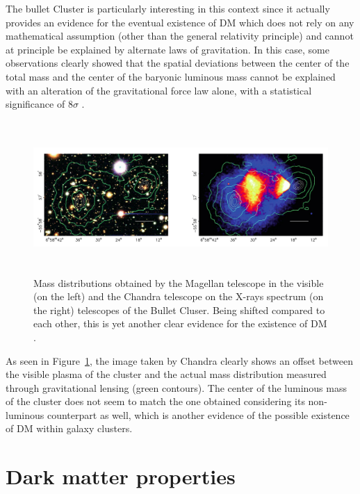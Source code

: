 \documentclass[a4paper, 10pt, openright]{report}
\begin{document}
The bullet Cluster is particularly interesting in this context since it actually provides an evidence for the eventual existence of \ac{DM} which does not rely on any mathematical assumption (other than the general relativity principle) and cannot at principle be explained by alternate laws of gravitation. In this case, some observations clearly showed that the spatial deviations between the center of the total mass and the center of the baryonic luminous mass cannot be explained with an alteration of the gravitational force law alone, with a statistical significance of $8 \sigma$ \cite{BulletClusterSigma}.

\begin{figure}[htbp]
\begin{center}
\includegraphics[width=14.2cm, height=5.8cm]{figs/BulletCluster.png}
\caption{Mass distributions obtained by the Magellan telescope in the visible (on the left) and the Chandra telescope on the X-rays spectrum (on the right) telescopes of the Bullet Cluser. Being shifted compared to each other, this is yet another clear evidence for the existence of \ac{DM} \cite{BulletClusterSigma}.}
\label{figure:BulletCluster}
\end{center}
\end{figure}

As seen in Figure~\ref{figure:BulletCluster}, the image taken by Chandra clearly shows an offset between the visible plasma of the cluster and the actual mass distribution measured through gravitational lensing (green contours). The center of the luminous mass of the cluster does not seem to match the one obtained considering its non-luminous counterpart as well, which is another evidence of the possible existence of \ac{DM} within galaxy clusters.

\section{Dark matter properties} \label{section:DMProperties}
\end{document}
